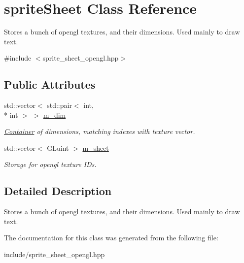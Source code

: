 \hypertarget{structsprite_sheet}{\section{sprite\-Sheet Class Reference}
\label{structsprite_sheet}
}


Stores a bunch of opengl textures, and their dimensions. Used mainly to draw text.  




{\ttfamily \#include $<$sprite\-\_\-sheet\-\_\-opengl.\-hpp$>$}

\subsection*{Public Attributes}
\begin{DoxyCompactItemize}
\item 
\hypertarget{structsprite_sheet_a9888d63a720d99dc77dcdce9f5d423e6}{std\-::vector$<$ std\-::pair$<$ int, \\*
int $>$ $>$ \hyperlink{structsprite_sheet_a9888d63a720d99dc77dcdce9f5d423e6}{m\-\_\-dim}}\label{structsprite_sheet_a9888d63a720d99dc77dcdce9f5d423e6}

\begin{DoxyCompactList}\small\item\em \hyperlink{struct_container}{Container} of dimensions, matching indexes with texture vector. \end{DoxyCompactList}\item 
\hypertarget{structsprite_sheet_aae42c60737eae96af8c246e166504e91}{std\-::vector$<$ G\-Luint $>$ \hyperlink{structsprite_sheet_aae42c60737eae96af8c246e166504e91}{m\-\_\-sheet}}\label{structsprite_sheet_aae42c60737eae96af8c246e166504e91}

\begin{DoxyCompactList}\small\item\em Storage for opengl texture I\-Ds. \end{DoxyCompactList}\end{DoxyCompactItemize}


\subsection{Detailed Description}
Stores a bunch of opengl textures, and their dimensions. Used mainly to draw text. 

The documentation for this class was generated from the following file\-:\begin{DoxyCompactItemize}
\item 
include/sprite\-\_\-sheet\-\_\-opengl.\-hpp\end{DoxyCompactItemize}
